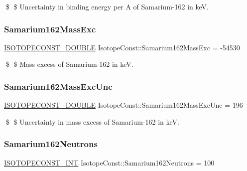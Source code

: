 \$ \$ Uncertainty in binding energy per A of Samarium-\/162 in keV. \mbox{\label{group___isotope_const-_samarium-_sm162_ga40313530518b09154cb9034c4a181421}} 
\subsubsection{\texorpdfstring{Samarium162\+Mass\+Exc}{Samarium162MassExc}}
{\footnotesize\ttfamily \mbox{\hyperlink{group___isotope_const-_macros_ga8f45a7272ce02c0b4c65c44636ed719a}{I\+S\+O\+T\+O\+P\+E\+C\+O\+N\+S\+T\+\_\+\+D\+O\+U\+B\+LE}} Isotope\+Const\+::\+Samarium162\+Mass\+Exc = -\/54530}

\$ \$ Mass excess of Samarium-\/162 in keV. \mbox{\label{group___isotope_const-_samarium-_sm162_ga321a67a4227f617f18d7c3b7bb5a7333}} 
\subsubsection{\texorpdfstring{Samarium162\+Mass\+Exc\+Unc}{Samarium162MassExcUnc}}
{\footnotesize\ttfamily \mbox{\hyperlink{group___isotope_const-_macros_ga8f45a7272ce02c0b4c65c44636ed719a}{I\+S\+O\+T\+O\+P\+E\+C\+O\+N\+S\+T\+\_\+\+D\+O\+U\+B\+LE}} Isotope\+Const\+::\+Samarium162\+Mass\+Exc\+Unc = 196}

\$ \$ Uncertainty in mass excess of Samarium-\/162 in keV. \mbox{\label{group___isotope_const-_samarium-_sm162_ga0455ef0bcc776c2f7600cf58d062fcc6}} 
\subsubsection{\texorpdfstring{Samarium162\+Neutrons}{Samarium162Neutrons}}
{\footnotesize\ttfamily \mbox{\hyperlink{group___isotope_const-_macros_ga5f18360b3e99483a35c32d789e62621c}{I\+S\+O\+T\+O\+P\+E\+C\+O\+N\+S\+T\+\_\+\+I\+NT}} Isotope\+Const\+::\+Samarium162\+Neutrons = 100}

